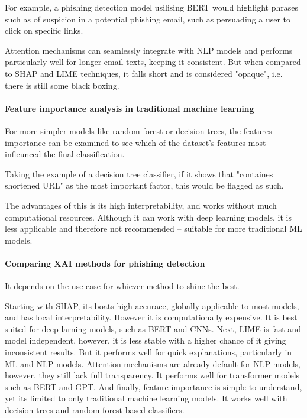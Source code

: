 \noindent For example, a phishing detection model usilising BERT would highlight phrases such as of suspicion in a potential phishing email, such as persuading a user to click on specific links.\newline

\noindent Attention mechanisms can seamlessly integrate with NLP models and performs particularly well for longer email texts, keeping it consistent. But when compared to SHAP and LIME techniques, it falls short and is considered "opaque", i.e. there is still some black boxing.

\paragraph{Feature importance analysis in traditional machine learning}
For more simpler models like random forest or decision trees, the features importance can be examined to see which of the dataset's features most infleunced the final classification.\newline

\noindent Taking the example of a decision tree classifier, if it shows that "containes shortened URL" as the most important factor, this would be flagged as such.\newline

\noindent The advantages of this is its high interpretability, and works without much computational resources. Although it can work with deep learning models, it is less applicable and therefore not recommended -- suitable for more traditional ML models.

\paragraph{Comparing XAI methods for phishing detection}
It depends on the use case for whiever method to shine the best.\newline

\noindent Starting with SHAP, its boats high accurace, globally applicable to most models, and has local interpretability. However it is computationally expensive. It is best suited for deep larning models, such as BERT and CNNs. Next, LIME is fast and model independent, however, it is less stable with a higher chance of it giving inconsistent results. But it performs well for quick explanations, particularly in ML and NLP models. Attention mechanisms are already default for NLP models, however, they still lack full transparency. It performs well for transformer models such as BERT and GPT. And finally, feature importance is simple to understand, yet its limited to only traditional machine learning models. It works well with decision trees and random forest based classifiers.

